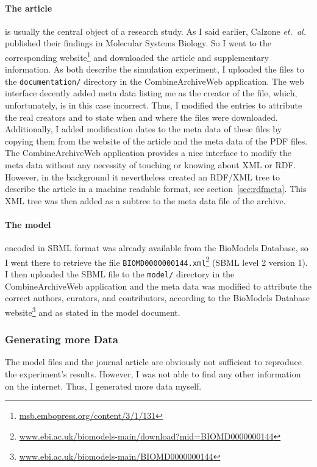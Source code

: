 \paragraph{The article} is usually the central object of a research study. As I said earlier, Calzone \emph{et.~al.} published their findings in Molecular Systems Biology. So I went to the corresponding website\footnote{\href{http://msb.embopress.org/content/3/1/131}{msb.embopress.org/content/3/1/131}} and downloaded the article and supplementary information.
As both describe the simulation experiment, I uploaded the files to the \texttt{documentation/} directory in the CombineArchiveWeb application.
The web interface decently added meta data listing me as the creator of the file, which, unfortunately, is in this case incorrect.
Thus, I modified the entries to attribute the real creators and to state when and where the files were downloaded.
Additionally, I added modification dates to the meta data of these files by copying them from the website of the article and the meta data of the PDF files.
The CombineArchiveWeb application provides a nice interface to modify the meta data without any necessity of touching or knowing about XML or RDF.
However, in the background it nevertheless created an RDF/XML tree to describe the article in a machine readable format, see section~\ref{sec:rdfmeta}.
This XML tree was then added as a subtree to the meta data file of the archive.


\paragraph{The model} encoded in SBML format was already available from the BioModels Database, so I went there to retrieve the file \texttt{BIOMD0000000144.xml}\footnote{\href{http://www.ebi.ac.uk/biomodels-main/download?mid=BIOMD0000000144}{www.ebi.ac.uk/biomodels-main/download?mid=BIOMD0000000144}} (SBML level 2 version 1).
I then uploaded the SBML file to the \texttt{model/} directory in the CombineArchiveWeb application and the meta data was modified to attribute the correct authors, curators, and contributors, according to the BioModels Database website\footnote{\href{http://www.ebi.ac.uk/biomodels-main/BIOMD0000000144}{www.ebi.ac.uk/biomodels-main/BIOMD0000000144}} and as stated in the model document.


\subsubsection{Generating more Data}
The model files and the journal article are obviously not sufficient to reproduce the experiment's results.
However, I was not able to find any other information on the internet.
Thus, I generated more data myself.

